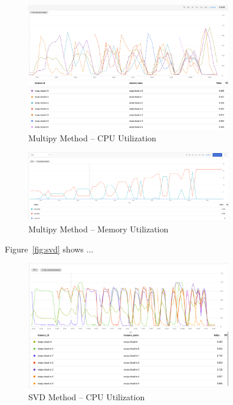 \documentclass{prog_report}
\begin{document}
\begin{figure}[h]
    \centering
    \includegraphics[width=0.8\textwidth]{img/multiply-cpu}
    \caption{Multipy Method – CPU Utilization}
    \label{fig:multiply-cpu}
\end{figure}

\begin{figure}[h]
    \centering
    \includegraphics[width=0.8\textwidth]{img/multiply-memory}
    \caption{Multipy Method – Memory Utilization}
    \label{fig:multiply-mem}
\end{figure}


Figure~\ref{fig:svd} shows ...

\begin{figure}[h]
    \centering
    \includegraphics[width=0.8\textwidth]{img/svd-cpu}
    \caption{SVD Method – CPU Utilization}
    \label{fig:svd-cpu}
\end{figure}
\end{document}
